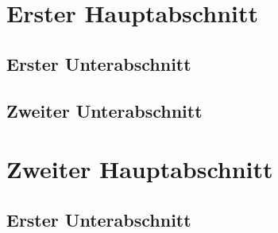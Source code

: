 \begin{refsection}
\section*{Erster Hauptabschnitt}		%
\subsection*{Erster Unterabschnitt}		%
\blindtext								
\subsection*{Zweiter Unterabschnitt}
\blindtext	
\section*{Zweiter Hauptabschnitt}		%
\subsection*{Erster Unterabschnitt}		%
\blindtext	

\RaggedRight
\nocite{*}
\printbibliography
\end{refsection}

